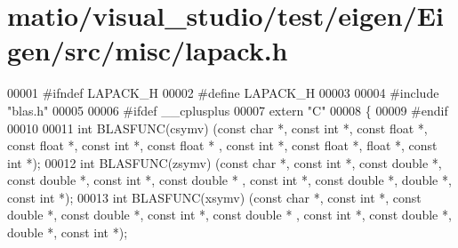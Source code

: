 \hypertarget{matio_2visual__studio_2test_2eigen_2_eigen_2src_2misc_2lapack_8h_source}{}\section{matio/visual\+\_\+studio/test/eigen/\+Eigen/src/misc/lapack.h}
\label{matio_2visual__studio_2test_2eigen_2_eigen_2src_2misc_2lapack_8h_source}

\begin{DoxyCode}
00001 \textcolor{preprocessor}{#ifndef LAPACK\_H}
00002 \textcolor{preprocessor}{#define LAPACK\_H}
00003 
00004 \textcolor{preprocessor}{#include "blas.h"}
00005 
00006 \textcolor{preprocessor}{#ifdef \_\_cplusplus}
00007 \textcolor{keyword}{extern} \textcolor{stringliteral}{"C"}
00008 \{
00009 \textcolor{preprocessor}{#endif}
00010 
00011 \textcolor{keywordtype}{int} BLASFUNC(csymv) (\textcolor{keyword}{const} \textcolor{keywordtype}{char} *, \textcolor{keyword}{const} \textcolor{keywordtype}{int} *, \textcolor{keyword}{const} \textcolor{keywordtype}{float}  *, \textcolor{keyword}{const} \textcolor{keywordtype}{float}  *, \textcolor{keyword}{const} \textcolor{keywordtype}{int} *, \textcolor{keyword}{const} \textcolor{keywordtype}{float}  *
      , \textcolor{keyword}{const} \textcolor{keywordtype}{int} *, \textcolor{keyword}{const} \textcolor{keywordtype}{float}  *, \textcolor{keywordtype}{float}  *, \textcolor{keyword}{const} \textcolor{keywordtype}{int} *);
00012 \textcolor{keywordtype}{int} BLASFUNC(zsymv) (\textcolor{keyword}{const} \textcolor{keywordtype}{char} *, \textcolor{keyword}{const} \textcolor{keywordtype}{int} *, \textcolor{keyword}{const} \textcolor{keywordtype}{double} *, \textcolor{keyword}{const} \textcolor{keywordtype}{double} *, \textcolor{keyword}{const} \textcolor{keywordtype}{int} *, \textcolor{keyword}{const} \textcolor{keywordtype}{double} *
      , \textcolor{keyword}{const} \textcolor{keywordtype}{int} *, \textcolor{keyword}{const} \textcolor{keywordtype}{double} *, \textcolor{keywordtype}{double} *, \textcolor{keyword}{const} \textcolor{keywordtype}{int} *);
00013 \textcolor{keywordtype}{int} BLASFUNC(xsymv) (\textcolor{keyword}{const} \textcolor{keywordtype}{char} *, \textcolor{keyword}{const} \textcolor{keywordtype}{int} *, \textcolor{keyword}{const} \textcolor{keywordtype}{double} *, \textcolor{keyword}{const} \textcolor{keywordtype}{double} *, \textcolor{keyword}{const} \textcolor{keywordtype}{int} *, \textcolor{keyword}{const} \textcolor{keywordtype}{double} *
      , \textcolor{keyword}{const} \textcolor{keywordtype}{int} *, \textcolor{keyword}{const} \textcolor{keywordtype}{double} *, \textcolor{keywordtype}{double} *, \textcolor{keyword}{const} \textcolor{keywordtype}{int} *);

\end{DoxyCode}
